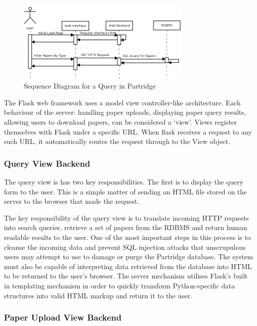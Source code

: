 \begin{figure}[!ht]
\centering
\includegraphics[width=0.75\textwidth]{images/design/backend_sequence.png}
\caption{Sequence Diagram for a Query in Partridge}
\label{fig:backend_sequence}
\end{figure}

The Flask web framework uses a model view controller-like architecture. Each
behaviour of the server: handling paper uploads, displaying paper query
results, allowing users to download papers, can be considered a `view'. Views
register themselves with Flask under a specific URL. When flask receives a
request to any such URL, it automatically routes the request through to the
View object\cite{flask2012}.

\subsubsection{Query View Backend}
The query view is has two key responsibilities. The first is to display the
query form to the user. This is a simple matter of sending an HTML file stored
on the server to the browser that made the request. 

The key responsibility of the query view is to translate incoming HTTP requests
into search queries, retrieve a set of papers from the RDBMS  and return human
readable results to the user. One of the most important steps in this process
is to cleanse the incoming data and prevent SQL injection attacks that
unscrupulous users may attempt to use to damage or purge the Partridge
database. The system must also be capable of interpreting data retrieved from
the database into HTML to be returned to the user's browser. The server
mechanism utilises Flask's built in templating mechanism in order to quickly
transform Python-specific data structures into valid HTML markup and return it
to the user\cite{flask2012}.

\subsubsection{Paper Upload View Backend}


